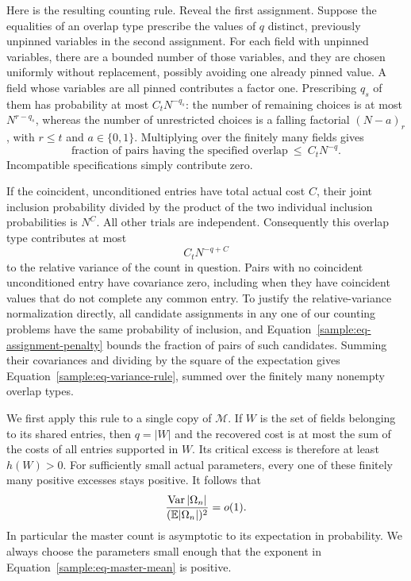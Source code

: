 Here is the resulting counting rule.  Reveal the first assignment.
Suppose the equalities of an overlap type prescribe the values of $q$
distinct, previously unpinned variables in the second assignment.
For each field with unpinned variables, there are a bounded number of
those variables, and they are chosen uniformly without replacement,
possibly avoiding one already pinned value.  A field whose variables
are all pinned contributes a factor one.  Prescribing $q_s$ of them has probability at most
$C_t N^{-q_s}$: the number of remaining choices is at most
$N^{r-q_s}$, whereas the number of unrestricted choices is a falling
factorial $(N-a)_r$, with $r\leq t$ and $a\in\{0,1\}$.
Multiplying over the finitely many fields gives
\begin{equation}\label{sample:eq-assignment-penalty}
\text{fraction of pairs having the specified overlap}
\ \leq\ C_tN^{-q}.
\end{equation}
Incompatible specifications simply contribute zero.

If the coincident, unconditioned entries have total actual cost $C$,
their joint inclusion probability divided by the product of the two
individual inclusion probabilities is $N^C$.  All other trials are
independent.  Consequently this overlap type contributes at most
\begin{equation}\label{sample:eq-variance-rule}
C_t N^{-q+C}
\end{equation}
to the relative variance of the count in question.  Pairs with no
coincident unconditioned entry have covariance zero, including when
they have coincident values that do not complete any common entry.
To justify the relative-variance normalization directly, all candidate
assignments in any one of our counting problems have the same
probability of inclusion, and Equation~\eqref{sample:eq-assignment-penalty}
bounds the fraction of pairs of such candidates.  Summing their
covariances and dividing by the square of the expectation gives
Equation~\eqref{sample:eq-variance-rule}, summed over the finitely many
nonempty overlap types.

We first apply this rule to a single copy of $\mathcal M$.  If $W$ is
the set of fields belonging to its shared entries, then $q=|W|$ and
the recovered cost is at most the sum of the costs of all entries
supported in $W$.  Its critical excess is therefore at least
$h(W)>0$.  For sufficiently small actual parameters, every one of
these finitely many positive excesses stays positive.  It follows that
\begin{equation}\label{sample:eq-single-concentration}
\frac{\operatorname{Var}|\Omega_n|}{(\mathbb E|\Omega_n|)^2}=o(1).
\end{equation}
In particular the master count is asymptotic to its expectation in
probability.  We always choose the parameters small enough that the
exponent in Equation~\eqref{sample:eq-master-mean} is positive.

